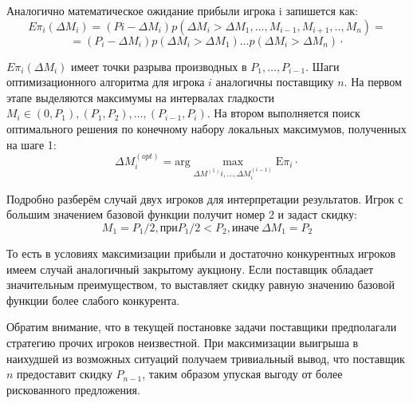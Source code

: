 Аналогично математическое ожидание прибыли игрока i запишется как:
\begin{equation}
	E\pi_{i}(\Delta M_i) =(Pi-\Delta M_i)p(\Delta M_i>\Delta M_1, \dots ,M_{i-1},M_{i+1},..,M_n)=
\end{equation}
\begin{equation}
	=(P_i-\Delta M_i)p(\Delta M_i >\Delta M_1) \dots p(\Delta M_i >\Delta M_n) \cdot   
\end{equation}

$E\pi_{i}(\Delta M_i)$ имеет точки разрыва производных в $P_1,\dots,P_{i-1}$. Шаги оптимизационного алгоритма для игрока $i$ аналогичны поставщику $n$. На первом этапе выделяются максимумы на интервалах гладкости $M_i \in (0,P_1) ,(P_1,P_2) ,\dots,(P_{i-1},P_i)$. 
На втором выполняется поиск оптимального решения по конечному набору локальных максимумов, полученных на шаге 1: 
\begin{equation}
	\Delta M_i^{(opt)}= \text{arg} \max_{\Delta M^{(1)}i,\dots,\Delta M^{(i-1)}_i}  \mathrm{E}\pi_{i} \cdot 
\end{equation}

Подробно разберём случай двух игроков для интерпретации результатов. Игрок с большим значением базовой функции получит номер 2 и задаст скидку:
\begin{equation}
	M_1=P_1/2 , при P_1/2 < P_2 , \text{иначе} \ \Delta M_1=P_2 
\end{equation}

То есть в условиях максимизации прибыли и достаточно конкурентных игроков имеем случай аналогичный закрытому аукциону. Если поставщик обладает значительным преимуществом, то выставляет скидку равную значению базовой функции более слабого конкурента.

Обратим внимание, что в текущей постановке задачи поставщики предполагали стратегию прочих игроков неизвестной. При максимизации выигрыша в наихудшей из возможных ситуаций получаем тривиальный вывод, что поставщик $n$ предоставит скидку $P_{n-1}$, таким образом упуская выгоду от более рискованного предложения. 
